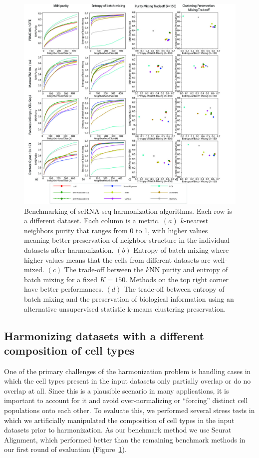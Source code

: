 \begin{figure}[htp]
    \centering
    \includegraphics[width=\textwidth]{figures/Fig2.jpeg}
    \caption[Benchmarking of scRNA-seq harmonization algorithms]{Benchmarking of scRNA-seq harmonization algorithms. Each row is a different dataset. Each column is a metric. $(a)$ $k$-nearest neighbors purity that ranges from 0 to 1, with higher values meaning better preservation of neighbor structure in the individual datasets after harmonization. $(b)$ Entropy of batch mixing where higher values means that the cells from different datasets are well-mixed. $(c)$ The trade-off between the $k$NN purity and entropy of batch mixing for a fixed $K=150$. Methods on the top right corner have better performances. $(d)$ The trade-off between entropy of batch mixing and the preservation of biological information using an alternative unsupervised statistic k-means clustering preservation.}
    \label{benchmarking_panel}
    \end{figure}

\subsection{Harmonizing datasets with a different composition of cell types}
One of the primary challenges of the harmonization problem is handling cases in which the cell types present in the input datasets only partially overlap or do no overlap at all. Since this is a plausible scenario in many applications, it is important to account for it and avoid over-normalizing or ``forcing'' distinct cell populations onto each other. To evaluate this, we performed several stress tests in which we artificially manipulated the composition of cell types in the input datasets prior to harmonization. As our benchmark method we use Seurat Alignment, which performed better than the remaining benchmark methods in our first round of evaluation (Figure~\ref{benchmarking_panel}). 


